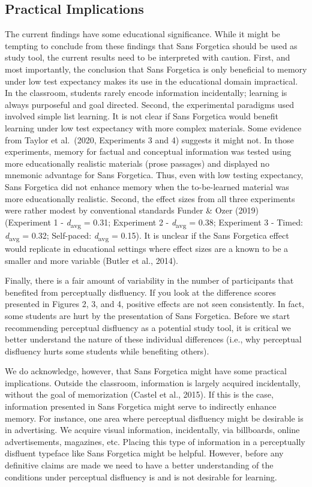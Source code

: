 \documentclass[
  english,
  jou]{apa7}
\begin{document}
\hypertarget{practical-implications}{%
\subsection{Practical Implications}\label{practical-implications}}

The current findings have some educational significance. While it might be tempting to conclude from these findings that Sans Forgetica should be used as study tool, the current results need to be interpreted with caution. First, and most importantly, the conclusion that Sans Forgetica is only beneficial to memory under low test expectancy makes its use in the educational domain impractical. In the classroom, students rarely encode information incidentally; learning is always purposeful and goal directed. Second, the experimental paradigms used involved simple list learning. It is not clear if Sans Forgetica would benefit learning under low test expectancy with more complex materials. Some evidence from Taylor et al.~(2020, Experiments 3 and 4) suggests it might not. In those experiments, memory for factual and conceptual information was tested using more educationally realistic materials (prose passages) and displayed no mnemonic advantage for Sans Forgetica. Thus, even with low testing expectancy, Sans Forgetica did not enhance memory when the to-be-learned material was more educationally realistic.
Second, the effect sizes from all three experiments were rather modest by conventional standards Funder \& Ozer (2019) (Experiment 1 - \emph{d}\textsubscript{avg} = 0.31; Experiment 2 - \emph{d}\textsubscript{avg} = 0.38; Experiment 3 - Timed: \emph{d}\textsubscript{avg} = 0.32; Self-paced: \emph{d}\textsubscript{avg} = 0.15). It is unclear if the Sans Forgetica effect would replicate in educational settings where effect sizes are a known to be a smaller and more variable (Butler et al., 2014).

Finally, there is a fair amount of variability in the number of participants that benefited from perceptually disfluency. If you look at the difference scores presented in Figures 2, 3, and 4, positive effects are not seen consistently. In fact, some students are hurt by the presentation of Sans Forgetica. Before we start recommending perceptual disfluency as a potential study tool, it is critical we better understand the nature of these individual differences (i.e., why perceptual disfluency hurts some students while benefiting others).

We do acknowledge, however, that Sans Forgetica might have some practical implications. Outside the classroom, information is largely acquired incidentally, without the goal of memorization (Castel et al., 2015). If this is the case, information presented in Sans Forgetica might serve to indirectly enhance memory. For instance, one area where perceptual disfluency might be desirable is in advertising. We acquire visual information, incidentally, via billboards, online advertisements, magazines, etc. Placing this type of information in a perceptually disfluent typeface like Sans Forgetica might be helpful. However, before any definitive claims are made we need to have a better understanding of the conditions under perceptual disfluency is and is not desirable for learning.
\end{document}
